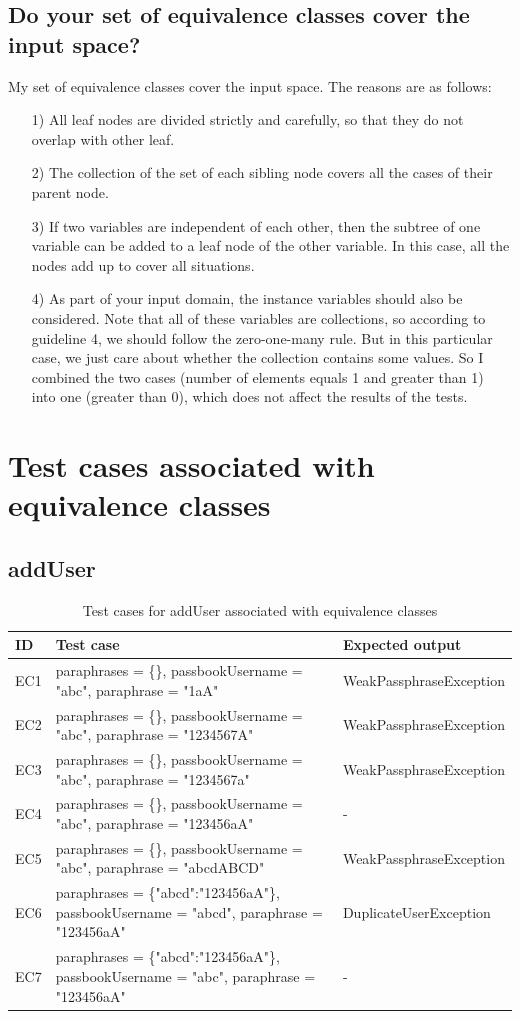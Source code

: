 \documentclass{article}
\begin{document}
\subsection{Do your set of equivalence classes cover the input space?}
My set of equivalence classes cover the input space. The reasons are as follows:
\begin{itemize}
\item [1)] All leaf nodes are divided strictly and carefully, so that they do not overlap with other leaf.
\item [2)] The collection of the set of each sibling node covers all the cases of their parent node.
\item [3)]
If two variables are independent of each other, then the subtree of one variable can be added to a leaf node of the other variable. In this case, all the nodes add up to cover all situations.
\item [4)]
As part of your input domain, the instance variables should also be considered. Note that all of these variables are collections, so according to guideline 4, we should follow the zero-one-many rule. But in this particular case, we just care about whether the collection contains some values. So I combined the two cases (number of elements equals 1 and greater than 1) into one (greater than 0), which does not affect the results of the tests.
\end{itemize}

\section{Test cases associated with equivalence classes}
\subsection{addUser}

\begin{longtable}{|p{2cm}|p{7cm}|p{5cm}|}
\caption{Test cases for addUser associated with equivalence classes}\\
\hline 
ID&Test case&Expected output\\
\hline  
EC1&paraphrases = \{\}, passbookUsername = "abc", paraphrase = "1aA"&WeakPassphraseException\\
\hline
EC2&paraphrases = \{\}, passbookUsername = "abc", paraphrase = "1234567A"&WeakPassphraseException\\
\hline
EC3&paraphrases = \{\}, passbookUsername = "abc", paraphrase = "1234567a"&WeakPassphraseException\\
\hline
EC4&paraphrases = \{\}, passbookUsername = "abc", paraphrase = "123456aA"&-\\
\hline
EC5&paraphrases = \{\}, passbookUsername = "abc", paraphrase = "abcdABCD"&WeakPassphraseException\\
\hline
EC6&paraphrases = \{"abcd":"123456aA"\}, passbookUsername = "abcd", paraphrase = "123456aA"&DuplicateUserException\\
\hline
EC7&paraphrases = \{"abcd":"123456aA"\}, passbookUsername = "abc", paraphrase = "123456aA"&-\\
\hline
\end{longtable}
\end{document}
